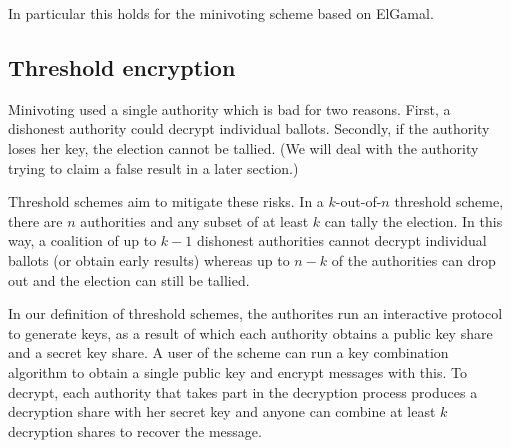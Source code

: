 \documentclass[envcountsame]{llncs}
\begin{document}
In particular this holds for the minivoting scheme based on ElGamal.

\subsection{Threshold encryption}

Minivoting used a single authority which is bad for two reasons. First, a
dishonest authority could decrypt individual ballots. Secondly, if the authority
loses her key, the election cannot be tallied. (We will deal with the authority
trying to claim a false result in a later section.)

Threshold schemes aim to mitigate these risks. In a $k$-out-of-$n$ threshold
scheme, there are $n$ authorities and any subset of at least $k$ can tally the
election. In this way, a coalition of up to $k - 1$ dishonest authorities cannot
decrypt individual ballots (or obtain early results) whereas up to $n - k$ of
the authorities can drop out and the election can still be tallied.

In our definition of threshold schemes, the authorites run an interactive
protocol to generate keys, as a result of which each authority obtains a public key share and a secret key share. A user of the scheme can run a key combination algorithm to obtain a single public key and encrypt messages with this. To decrypt, each authority that takes part in the decryption process produces a decryption share with her secret key and anyone can combine at least $k$ decryption shares to recover the message.
\end{document}
